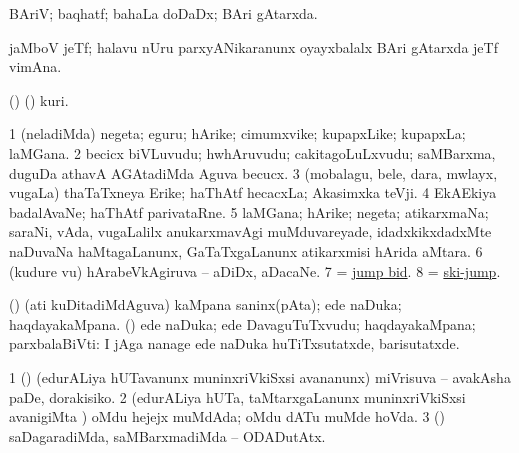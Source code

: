 \bentry
{}
\gl{\gu}
\bmng
BAriV; baqhatf; bahaLa doDaDx; BAri gAtarxda. 
\emng
\eentry

\bentry
{}
\gl{\nA}
\bmng
jaMboV jeTf; halavu nUru parxyANikaranunx oyayxbalalx BAri gAtarxda jeTf vimAna. 
\emng
\eentry

\bentry
{}
\gl{\nA}
\bmng
(\AseTxrXV) (\AmA) kuri. 
\emng
\eentry

\bentry
{}
\gl{\nA}
\bmng
\bnum
\num{1} (neladiMda) negeta; eguru; hArike; cimumxvike; kupapxLike; kupapxLa; laMGana. 
\num{2} becicx biVLuvudu; hwhAruvudu; cakitagoLuLxvudu; saMBarxma, duguDa athavA AGAtadiMda Aguva becucx. 
\num{3} (mobalagu, bele, dara, mwlayx, \mo vugaLa) thaTaTxneya Erike; haThAtf hecacxLa; Akasimxka teVji. 
\num{4} EkAEkiya badalAvaNe; haThAtf parivataRne. 
\num{5} laMGana; hArike; negeta; atikarxmaNa; saraNi, vAda, \mo vugaLalilx anukarxmavAgi muMduvareyade, idadxkikxdadxMte naDuvaNa haMtagaLanunx, GaTaTxgaLanunx atikarxmisi hArida aMtara. 
\num{6} (kudure \mo vu) hArabeVkAgiruva -- aDiDx, aDacaNe. 
\num{7}  = \hyperlink{jump bid}{jump bid}. 
\num{8} = \hyperref{kandict_s.pdf}{S}{ski-jump}{ski-jump}. 
\enum
\emng

\noindent
\gl{\pagu}
\bmng
{} (\ashi) 
\banum
{} (ati kuDitadiMdAguva) kaMpana saninx(pAta); ede naDuka; haqdayakaMpana. 
 (\rUpa) ede naDuka; ede DavaguTuTxvudu; haqdayakaMpana; parxbalaBiVti:  I jAga nanage ede naDuka huTiTxsutatxde, barisutatxde. 
\eanum
\emng

\noindent
\gl{\nuga}
\bmng
\bnum
\num{1}  (\ashi) (edurALiya hUTavanunx muninxriVkiSxsi avananunx) miVrisuva -- avakAsha paDe, dorakisiko. 
\num{2}  (edurALiya hUTa, taMtarxgaLanunx muninxriVkiSxsi avanigiMta ) oMdu hejejx muMdAda; oMdu dATu muMde hoVda. 
\num{3}  (\AmA) saDagaradiMda, saMBarxmadiMda -- ODADutAtx. 
\enum
\emng
\eentry


